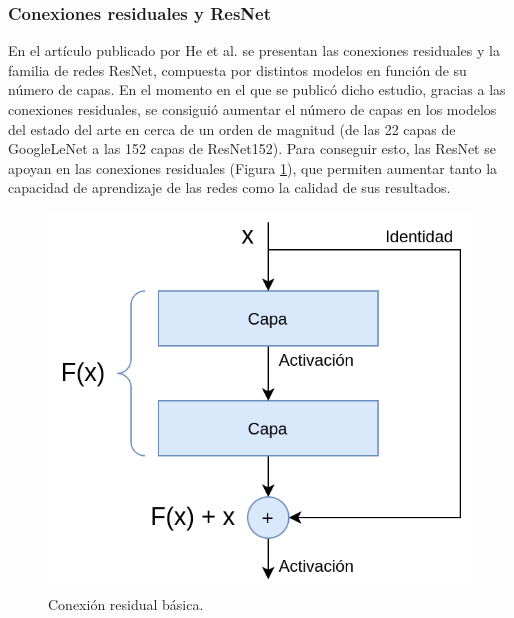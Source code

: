 \pagebreak

\subsubsection{Conexiones residuales y ResNet}


En el artículo publicado por He et al. \cite{resnet} se presentan las conexiones residuales y la familia de redes ResNet, compuesta por distintos modelos en función de su número de capas. En el momento en el que se publicó dicho estudio, gracias a las conexiones residuales, se consiguió aumentar el número de capas en los modelos del estado del arte en cerca de un orden de magnitud (de las 22 capas de GoogleLeNet \cite{googlelenet} a las 152 capas de ResNet152). Para conseguir esto, las ResNet se apoyan en las conexiones residuales (Figura \ref{fig:residual}), que permiten aumentar tanto la capacidad de aprendizaje de las redes como la calidad de sus resultados.


\begin{figure}
\vspace{-10pt}
\includegraphics[width=0.95\linewidth]{imagenes/residual-connection.png} 
\caption{Conexión residual básica.}
\label{fig:residual}
\end{figure}

